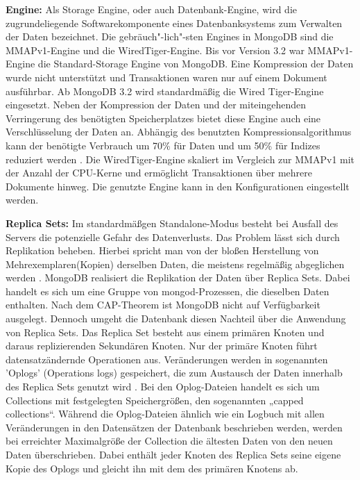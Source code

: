\noindent
{}
\textbf{Engine:}
Als Storage Engine, oder auch Datenbank-Engine, wird die zugrundeliegende Softwarekomponente eines Datenbanksystems zum Verwalten der Daten bezeichnet. Die gebräuch"-lich"-sten Engines in MongoDB sind die MMAPv1-Engine und die WiredTiger-Engine.\newline
Bis vor Version 3.2 war MMAPv1-Engine die Standard-Storage Engine von MongoDB. Eine Kompression der Daten wurde nicht unterstützt und Transaktionen waren nur auf einem Dokument ausführbar. Ab MongoDB 3.2 wird standardmäßig die Wired Tiger-Engine eingesetzt. Neben der Kompression der Daten und der miteingehenden Verringerung des benötigten Speicherplatzes bietet diese Engine auch eine Verschlüsselung der Daten an. Abhängig des benutzten Kompressionsalgorithmus kann der benötigte Verbrauch um 70\% für Daten und um 50\% für Indizes reduziert werden \cite{DB3.5}. Die WiredTiger-Engine skaliert im Vergleich zur MMAPv1 mit der Anzahl der CPU-Kerne und ermöglicht Transaktionen über mehrere Dokumente hinweg. Die genutzte Engine kann in den Konfigurationen eingestellt werden.
\newline

\noindent
{}
\textbf{Replica Sets:}
Im standardmäßgen Standalone-Modus besteht bei Ausfall des Servers die potenzielle Gefahr des Datenverlusts. Das Problem lässt sich durch Replikation beheben. Hierbei spricht man von der bloßen Herstellung von Mehrexemplaren(Kopien) derselben Daten, die meistens regelmäßig abgeglichen werden \cite{DB3.6}. MongoDB realisiert die Replikation der Daten über Replica Sets\cite{DB3.7}. Dabei handelt es sich um eine Gruppe von mongod-Prozessen, die dieselben Daten enthalten. Nach dem CAP-Theorem ist MongoDB nicht auf Verfügbarkeit ausgelegt. Dennoch umgeht die Datenbank diesen Nachteil über die Anwendung von Replica Sets. Das Replica Set besteht aus einem primären Knoten und daraus replizierenden Sekundären Knoten.
Nur der primäre Knoten führt datensatzändernde Operationen aus. Veränderungen werden in sogenannten 'Oplogs' (Operations logs) gespeichert, die zum Austausch der Daten innerhalb des Replica Sets genutzt wird \cite{DB3.8}. Bei den Oplog-Dateien handelt es sich um Collections mit festgelegten Speichergrößen, den sogenannten „capped collections“. Während die Oplog-Dateien ähnlich wie ein Logbuch mit allen Veränderungen in den Datensätzen der Datenbank beschrieben werden, werden bei erreichter Maximalgröße der Collection die ältesten Daten von den neuen Daten überschrieben. Dabei enthält jeder Knoten des Replica Sets seine eigene Kopie des Oplogs und gleicht ihn mit dem des primären Knotens ab.

